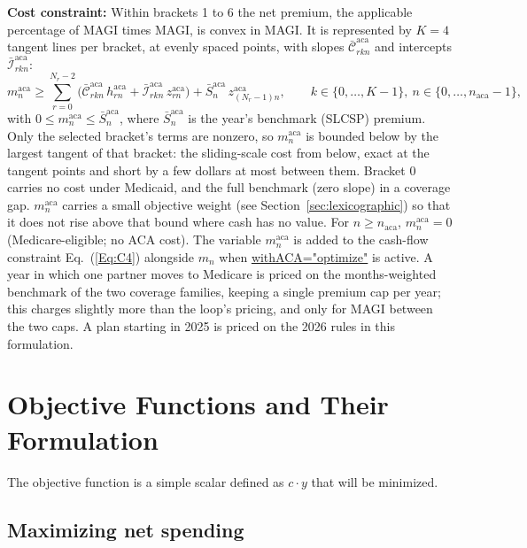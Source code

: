 \documentclass[fleqn,12pt]{report}
\newcommand{\code}[1]{\url{#1}}
\begin{document}
	\textbf{Cost constraint:}
	Within brackets 1 to 6 the net premium, the applicable percentage of MAGI times MAGI, is convex
	in MAGI. It is represented by $K = 4$ tangent lines per bracket, at evenly spaced points, with
	slopes $\bar{\mathcal{C}}^{\mathrm{aca}}_{rkn}$ and intercepts $\bar{\mathcal{I}}^{\mathrm{aca}}_{rkn}$:
	\begin{equation}
		m^{\mathrm{aca}}_n \ge \sum_{r=0}^{N_r-2}
		\bigl(\bar{\mathcal{C}}^{\mathrm{aca}}_{rkn}\, h^{\mathrm{aca}}_{rn}
		+ \bar{\mathcal{I}}^{\mathrm{aca}}_{rkn}\, z^{\mathrm{aca}}_{rn}\bigr)
		+ \bar{S}^{\mathrm{aca}}_n\, z_{(N_r-1)n}^{\mathrm{aca}},
		\qquad k \in \{0,\ldots,K-1\},\ n \in \{0, \ldots, n_{\mathrm{aca}}-1\},
	\end{equation}
	with $0 \le m^{\mathrm{aca}}_n \le \bar{S}^{\mathrm{aca}}_n$, where $\bar{S}^{\mathrm{aca}}_n$ is the
	year's benchmark (SLCSP) premium.
	Only the selected bracket's terms are nonzero, so $m^{\mathrm{aca}}_n$ is bounded below by the
	largest tangent of that bracket: the sliding-scale cost from below, exact at the tangent points
	and short by a few dollars at most between them.
	Bracket 0 carries no cost under Medicaid, and the full benchmark (zero slope) in a coverage gap.
	$m^{\mathrm{aca}}_n$ carries a small objective weight (see Section~\ref{sec:lexicographic}) so that it
	does not rise above that bound where cash has no value.
	For $n \ge n_{\mathrm{aca}}$, $m^{\mathrm{aca}}_n = 0$ (Medicare-eligible; no ACA cost).
	The variable $m^{\mathrm{aca}}_n$ is added to the cash-flow constraint Eq.~(\ref{Eq:C4})
	alongside $m_n$ when \code{withACA="optimize"} is active.
	A year in which one partner moves to Medicare is priced on the months-weighted benchmark of the
	two coverage families, keeping a single premium cap per year; this charges slightly more than the
	loop's pricing, and only for MAGI between the two caps.
	A plan starting in 2025 is priced on the 2026 rules in this formulation.

\chapter{Objective Functions and Their Formulation}
\label{Chap:Objectives}
The objective function is a simple scalar defined as $c\cdot y$ that will be minimized.

\section{Maximizing net spending}
\end{document}
